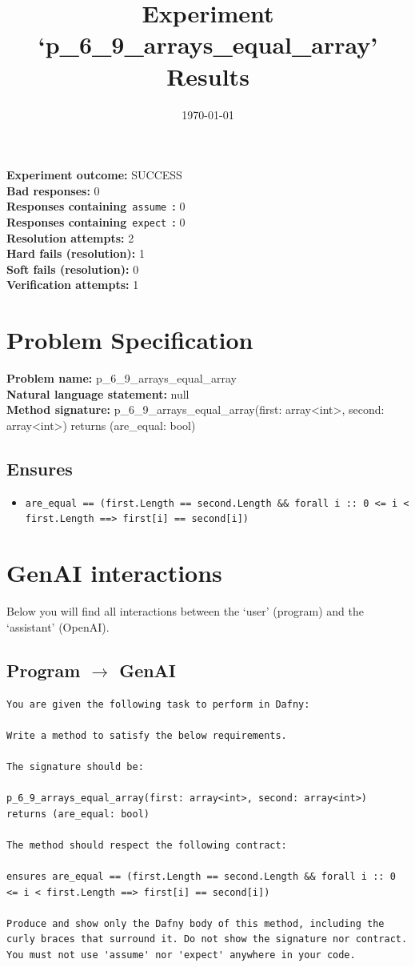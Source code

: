 \documentclass{article}
\begin{document}
\title{Experiment `p\_6\_9\_arrays\_equal\_array' Results}
\author{\today}
\date{}
\maketitle
\textbf{Experiment outcome: }SUCCESS
\\\textbf{Bad responses: }0
\\\textbf{Responses containing}~\texttt{assume}~\textbf{: }0
\\\textbf{Responses containing}~\texttt{expect}~\textbf{: }0
\\\textbf{Resolution attempts: }2
\\\textbf{Hard fails (resolution): }1
\\\textbf{Soft fails (resolution): }0
\\\textbf{Verification attempts: }1
\section*{Problem Specification}
\textbf{Problem name: }p\_6\_9\_arrays\_equal\_array
\\\textbf{Natural language statement: }null
\\\textbf{Method signature: }p\_6\_9\_arrays\_equal\_array(first: array<int>, second: array<int>) returns (are\_equal: bool)
\subsection*{Ensures}
\begin{itemize}
\item \texttt{are\_equal == (first.Length == second.Length \&\& forall i :: 0 <= i < first.Length ==> first[i] == second[i])}
\end{itemize}
\clearpage
\section*{GenAI interactions}
Below you will find all interactions between the `user' (program) and the `assistant' (OpenAI).
\subsection*{Program $\rightarrow$ GenAI}
\begin{lstlisting}
You are given the following task to perform in Dafny:

Write a method to satisfy the below requirements.

The signature should be:

p_6_9_arrays_equal_array(first: array<int>, second: array<int>) returns (are_equal: bool)

The method should respect the following contract:

ensures are_equal == (first.Length == second.Length && forall i :: 0 <= i < first.Length ==> first[i] == second[i])

Produce and show only the Dafny body of this method, including the curly braces that surround it. Do not show the signature nor contract. You must not use 'assume' nor 'expect' anywhere in your code.
\end{lstlisting}
\end{document}
